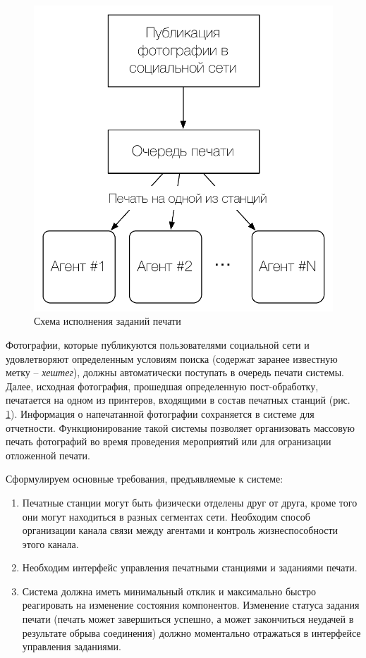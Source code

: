 \documentclass[a4paper,14pt,href]{article}
\begin{document}
\begin{figure}[htbp]
\begin{center}
  \includegraphics[scale=0.7]{print_schema.pdf}
    \caption{Схема исполнения заданий печати}
    \label{fig:PrintSchema}
\end{center}
\end{figure}

Фотографии, которые публикуются пользователями социальной сети и удовлетворяют определенным условиям поиска (содержат заранее известную метку -- \textit{хештег}), должны автоматически поступать в очередь печати системы. Далее, исходная фотография, прошедшая определенную пост-обработку, печатается на одном из принтеров, входящими в состав печатных станций (рис. \ref{fig:PrintSchema}). Информация о напечатанной фотографии сохраняется в системе для отчетности. Функционирование такой системы позволяет организовать массовую печать фотографий во время проведения мероприятий или для огранизации отложенной печати.

Сформулируем основные требования, предъявляемые к системе:
\begin{enumerate}
  \item Печатные станции могут быть физически отделены друг от друга, кроме того они могут находиться в разных сегментах сети. Необходим способ
    организации канала связи между агентами и контроль жизнеспособности этого канала.

  \item Необходим интерфейс управления печатными станциями и заданиями печати.

  \item Система должна иметь минимальный отклик и максимально быстро реагировать на изменение состояния компонентов. Изменение статуса задания печати (печать может завершиться успешно, а может закончиться неудачей в результате обрыва соединения) должно моментально отражаться в интерфейсе управления заданиями.
\end{enumerate}
\end{document}
